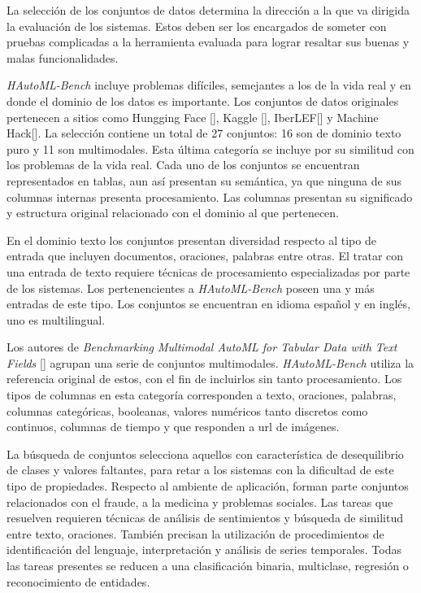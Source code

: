 La selección de los conjuntos de datos determina la dirección a la que va dirigida la evaluación de los sistemas. Estos deben ser los encargados de someter con 
pruebas complicadas a la herramienta evaluada para lograr resaltar sus buenas y malas funcionalidades.

\textit{HAutoML-Bench} incluye problemas difíciles, semejantes a los de la vida real y en donde el dominio de los datos 
es importante. Los conjuntos de datos originales pertenecen a sitios como Hungging Face [\cite{67}], Kaggle [\cite{44}], IberLEF[\cite{68}] y Machine Hack[\cite{69}]. La 
selección contiene un total de 27 conjuntos: 16 son de dominio texto puro y 11 son multimodales. Esta última categoría se incluye por su similitud con los 
problemas de la vida real. Cada uno de los conjuntos se encuentran representados en tablas, aun así presentan su semántica, ya que ninguna de sus columnas internas 
presenta procesamiento. Las columnas presentan su significado y estructura original relacionado con el dominio al que pertenecen.

En el dominio texto los conjuntos presentan diversidad respecto al tipo de entrada que incluyen documentos, oraciones, palabras entre otras. 
El tratar con una entrada de texto requiere técnicas de procesamiento especializadas por parte de los sistemas. Los pertenencientes a \textit{HAutoML-Bench} poseen una y 
más entradas de este tipo. Los conjuntos se encuentran en idioma español y en inglés, uno es multilingual.

Los autores de \textit{Benchmarking Multimodal AutoML for Tabular Data with Text Fields} [\cite{67}] agrupan una serie de conjuntos multimodales. \textit{HAutoML-Bench}
utiliza la referencia original de estos, con el fin de incluirlos sin tanto procesamiento. Los tipos de columnas en esta categoría corresponden a texto, 
oraciones, palabras, columnas categóricas, booleanas, valores numéricos tanto discretos como continuos, columnas de tiempo y que responden a url de imágenes.

La búsqueda de conjuntos selecciona aquellos con característica de desequilibrio de clases y valores faltantes, para retar a los sistemas con la dificultad de este tipo de 
propiedades. Respecto al ambiente de aplicación, forman parte conjuntos relacionados con el fraude, a la medicina y problemas sociales. Las tareas que resuelven 
requieren técnicas de análisis de sentimientos y búsqueda de similitud entre texto, oraciones. También precisan la utilización de procedimientos de identificación 
del lenguaje, interpretación y análisis de series temporales. Todas las tareas presentes se reducen a una clasificación binaria, multiclase, regresión o 
reconocimiento de entidades.

